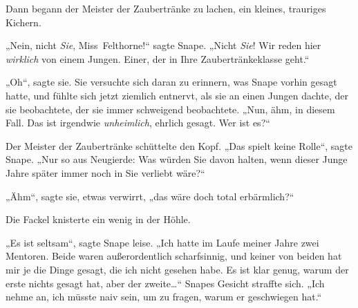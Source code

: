 Dann begann der Meister der Zaubertränke zu lachen, ein kleines, trauriges Kichern.

„Nein, nicht \emph{Sie}, Miss~Felthorne!“ sagte Snape. „Nicht \emph{Sie}! Wir reden hier \emph{wirklich} von einem Jungen. Einer, der in Ihre Zaubertränkeklasse geht.“

„Oh“, sagte sie. Sie versuchte sich daran zu erinnern, was Snape vorhin gesagt hatte, und fühlte sich jetzt ziemlich entnervt, als sie an einen Jungen dachte, der sie beobachtete, der sie immer schweigend beobachtete. „Nun, ähm, in diesem Fall. Das ist irgendwie \emph{unheimlich}, ehrlich gesagt. Wer ist es?“

Der Meister der Zaubertränke schüttelte den Kopf. „Das spielt keine Rolle“, sagte Snape. „Nur so aus Neugierde: Was würden Sie davon halten, wenn dieser Junge Jahre später immer noch in Sie verliebt wäre?“

„Ähm“, sagte sie, etwas verwirrt, „das wäre doch total erbärmlich?“

Die Fackel knisterte ein wenig in der Höhle.

„Es ist seltsam“, sagte Snape leise. „Ich hatte im Laufe meiner Jahre zwei Mentoren. Beide waren außerordentlich scharfsinnig, und keiner von beiden hat mir je die Dinge gesagt, die ich nicht gesehen habe. Es ist klar genug, warum der erste nichts gesagt hat, aber der zweite…“ Snapes Gesicht straffte sich. „Ich nehme an, ich müsste naiv sein, um zu fragen, warum er geschwiegen hat.“

